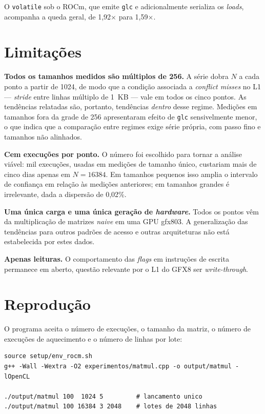 \documentclass[12pt]{article}
\begin{document}
O \texttt{volatile} sob o ROCm, que emite \texttt{glc} e adicionalmente
serializa os \textit{loads}, acompanha a queda geral, de 1,92$\times$ para
1,59$\times$.

\section{Limitações}

\textbf{Todos os tamanhos medidos são múltiplos de 256.} A série dobra $N$ a
cada ponto a partir de 1024, de modo que a condição associada a \textit{conflict
misses} no L1 --- \textit{stride} entre linhas múltiplo de 1~KB --- vale em todos
os cinco pontos. As tendências relatadas são, portanto, tendências \emph{dentro}
desse regime. Medições em tamanhos fora da grade de 256 apresentaram efeito de
\texttt{glc} sensivelmente menor, o que indica que a comparação entre regimes
exige série própria, com passo fino e tamanhos não alinhados.

\textbf{Cem execuções por ponto.} O número foi escolhido para tornar a análise
viável: mil execuções, usadas em medições de tamanho único, custariam mais de
cinco dias apenas em $N=16384$. Em tamanhos pequenos isso amplia o intervalo de
confiança em relação às medições anteriores; em tamanhos grandes é irrelevante,
dada a dispersão de 0,02\%.

\textbf{Uma única carga e uma única geração de \textit{hardware}.} Todos os
pontos vêm da multiplicação de matrizes \textit{naive} em uma GPU gfx803. A
generalização das tendências para outros padrões de acesso e outras arquiteturas
não está estabelecida por estes dados.

\textbf{Apenas leituras.} O comportamento das \textit{flags} em instruções de
escrita permanece em aberto, questão relevante por o L1 do GFX8 ser
\textit{write-through}.

\section{Reprodução}

O programa aceita o número de execuções, o tamanho da matriz, o número de
execuções de aquecimento e o número de linhas por lote:

\begin{verbatim}
source setup/env_rocm.sh
g++ -Wall -Wextra -O2 experimentos/matmul.cpp -o output/matmul -lOpenCL

./output/matmul 100  1024 5         # lancamento unico
./output/matmul 100 16384 3 2048    # lotes de 2048 linhas
\end{verbatim}
\end{document}
